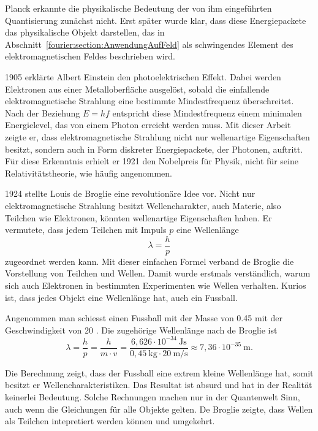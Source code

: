 Planck erkannte die physikalische Bedeutung der von ihm eingeführten Quantisierung zunächst nicht. 
Erst später wurde klar, dass diese Energiepackete das physikalische Objekt darstellen, das in Abschnitt~\ref{fourier:section:AnwendungAufFeld} als schwingendes Element des elektromagnetischen Feldes beschrieben wird.


1905 erklärte Albert Einstein den photoelektrischen Effekt. 
%
%
Dabei werden Elektronen aus einer Metalloberfläche ausgelöst, sobald die einfallende elektromagnetische Strahlung eine bestimmte Mindestfrequenz überschreitet. 
Nach der Beziehung $E = hf$ entspricht diese Mindestfrequenz einem minimalen Energielevel, das von einem Photon erreicht werden muss.
Mit dieser Arbeit zeigte er, dass elektromagnetische Strahlung nicht nur wellenartige Eigenschaften besitzt, sondern auch in Form diskreter Energiepackete, der Photonen, auftritt. 
Für diese Erkenntnis erhielt er 1921 den Nobelpreis für Physik, nicht für seine Relativitätstheorie, wie häufig angenommen.
%



1924 stellte Louis de Broglie eine revolutionäre Idee vor.
%
Nicht nur elektromagnetische Strahlung besitzt Wellencharakter, auch Materie, also Teilchen wie Elektronen, könnten wellenartige Eigenschaften haben.
Er vermutete, dass jedem Teilchen mit Impuls $p$ eine Wellenlänge
\begin{equation}
	\lambda = \frac{h}{p}
\end{equation}	
zugeordnet werden kann.
Mit dieser einfachen Formel verband de Broglie die Vorstellung von Teilchen und Wellen. Damit wurde erstmals verständlich, warum sich auch Elektronen in bestimmten Experimenten wie Wellen verhalten.
Kurios ist, dass jedes Objekt eine Wellenlänge hat, auch ein Fussball.


\begin{beispiel}
Angenommen man schiesst einen Fussball mit der Masse von 0.45  mit der Geschwindigkeit von 20 .
Die zugehörige Wellenlänge nach de Broglie ist 
\begin{equation}
	\lambda = \frac{h}{p} = \frac{h}{m \cdot v} = 	\frac{6{,}626 \cdot 10^{-34} \ \text{Js}}{0{,}45 \ \text{kg} \cdot 20 \ \text{m/s}} \approx 7{,}36 \cdot 10^{-35} \ \text{m}.
\end{equation}	

Die Berechnung zeigt, dass der Fussball eine extrem kleine Wellenlänge hat, somit besitzt er Wellencharakteristiken.
Das Resultat ist absurd und hat in der Realität keinerlei Bedeutung.
Solche Rechnungen machen nur in der Quantenwelt Sinn, auch wenn die Gleichungen für alle Objekte gelten. 
De Broglie zeigte, dass Wellen als Teilchen intepretiert werden können und umgekehrt. 
\end{beispiel}


